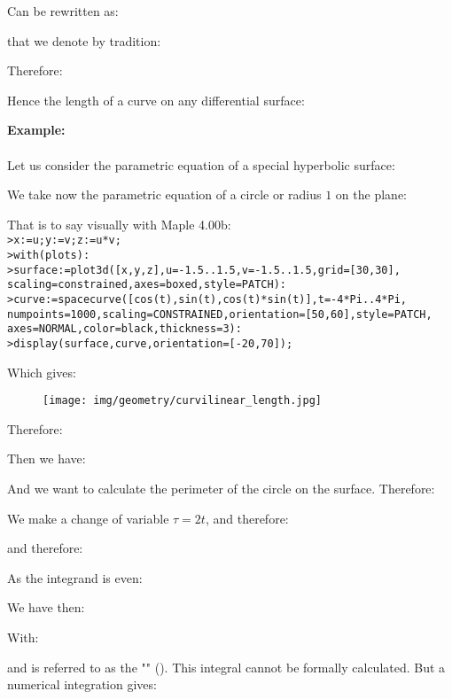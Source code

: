 	Can be rewritten as:
	
	that we denote by tradition:
	
	Therefore:
	
	Hence the length of a curve on any differential surface:
	
	
	\pagebreak
	\begin{tcolorbox}[colframe=black,colback=white,sharp corners]
	\textbf{{\Large {}}Example:}\\\\
	Let us consider the parametric equation of a special hyperbolic surface:
	
	We take now the parametric equation of a circle or radius $1$ on the plane:
	
	That is to say visually with Maple 4.00b:\\
	
	\texttt{>x:=u;y:=v;z:=u*v;\\
	>with(plots):\\
	>surface:=plot3d([x,y,z],u=-1.5..1.5,v=-1.5..1.5,grid=[30,30],\\
	scaling=constrained,axes=boxed,style=PATCH):\\
	>curve:=spacecurve([cos(t),sin(t),cos(t)*sin(t)],t=-4*Pi..4*Pi,\\
	numpoints=1000,scaling=CONSTRAINED,orientation=[50,60],style=PATCH,\\
	axes=NORMAL,color=black,thickness=3):\\
	>display(surface,curve,orientation=[-20,70]);
	}
	
	Which gives:
	\begin{figure}[H]
		\centering
		\texttt{[image: img/geometry/curvilinear\_length.jpg]}
	\end{figure}
	\end{tcolorbox}
	
	\begin{tcolorbox}[colframe=black,colback=white,sharp corners]
	Therefore:
	
	Then we have:
	
	And we want to calculate the perimeter of the circle on the surface. Therefore:
	
	We make a change of variable $\tau=2t$, and therefore:
	
	and therefore:
	
	\end{tcolorbox}
	
	\begin{tcolorbox}[colframe=black,colback=white,sharp corners]
	As the integrand is even:
	
	We have then:
		
	With:
	
	and is referred to as the "\label{elliptic integral riemann space}" (). This integral cannot be formally calculated. But a numerical integration gives:
	
	\end{tcolorbox}
	
